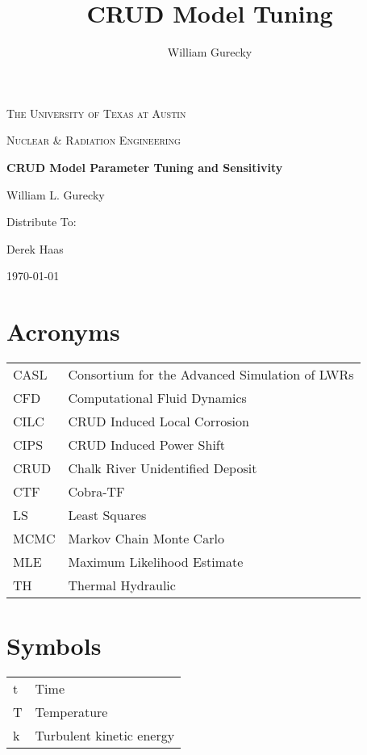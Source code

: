 \documentclass[10pt,a4paper]{report}
\author{William Gurecky}
\title{CRUD Model Tuning}
\begin{document}
\begin{titlepage}
	\centering
	{\scshape\LARGE The University of Texas at Austin \par}
	\vspace{1cm}
	{\scshape\Large Nuclear \& Radiation Engineering \par}
	\vspace{1.5cm}
	{\huge\bfseries CRUD Model Parameter Tuning and Sensitivity \par}
	\vspace{2cm}
	{\Large William L. Gurecky \par}
	\vfill

	\begin{flushright}
	Distribute To: \par
	\bigskip
        Derek Haas  \\
	\end{flushright}
	\vfill
	{\large \today\par}
\end{titlepage}
\pagebreak
\tableofcontents
\pagebreak

\section*{Acronyms}
\begin{tabular}{l l}
CASL & Consortium for the Advanced Simulation of LWRs \\
CFD &  Computational Fluid Dynamics \\
CILC & CRUD Induced Local Corrosion \\
CIPS & CRUD Induced Power Shift \\
CRUD & Chalk River Unidentified Deposit \\
CTF &  Cobra-TF \\
LS  &  Least Squares \\
MCMC & Markov Chain Monte Carlo \\
MLE &  Maximum Likelihood Estimate \\
TH  & Thermal Hydraulic \\
\end{tabular}

\section*{Symbols}
\begin{tabular}{l l}
t & Time \\
T & Temperature \\
k & Turbulent kinetic energy \\
\end{tabular}
\end{document}
